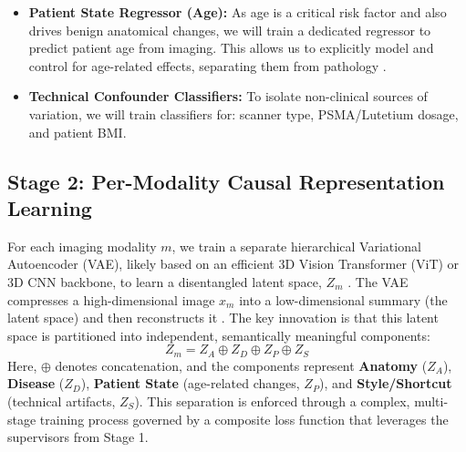 \documentclass[11pt, a4paper]{article}
\begin{document}
\begin{itemize}
    \item \textbf{Patient State Regressor (Age):} As age is a critical risk factor and also drives benign anatomical changes, we will train a dedicated regressor to predict patient age from imaging. This allows us to explicitly model and control for age-related effects, separating them from pathology \cite{PuglisiAlexander2025, ZhangHager2025}.
    \item \textbf{Technical Confounder Classifiers:} To isolate non-clinical sources of variation, we will train classifiers for: scanner type, PSMA/Lutetium dosage, and patient BMI.
\end{itemize}

\subsection{Stage 2: Per-Modality Causal Representation Learning}
For each imaging modality $m$, we train a separate hierarchical Variational Autoencoder (VAE), likely based on an efficient 3D Vision Transformer (ViT) or 3D CNN backbone, to learn a disentangled latent space, $Z_m$ \cite{KimOh2025, LeeByeon2025, FragemannArdizzone2022}. The VAE compresses a high-dimensional image $x_m$ into a low-dimensional summary (the latent space) and then reconstructs it \cite{HeSarwal2024, FriedrichFrisch2024}. The key innovation is that this latent space is partitioned into independent, semantically meaningful components:
$$ Z_m = Z_A \oplus Z_D \oplus Z_P \oplus Z_S $$
Here, $\oplus$ denotes concatenation, and the components represent \textbf{Anatomy} ($Z_A$), \textbf{Disease} ($Z_D$), \textbf{Patient State} (age-related changes, $Z_P$), and \textbf{Style/Shortcut} (technical artifacts, $Z_S$). This separation is enforced through a complex, multi-stage training process governed by a composite loss function that leverages the supervisors from Stage 1.
\end{document}
